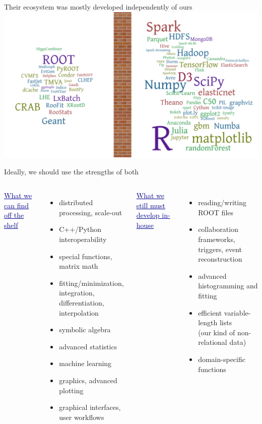 \documentclass[aspectratio=169]{beamer}
\begin{document}
\begin{frame}{Their ecosystem was mostly developed independently of ours}
\vspace{0.17 cm}
\includegraphics[width=\linewidth]{separation-2.png}
\end{frame}

\begin{frame}{Ideally, we should use the strengths of both}
\vspace{0.5 cm}
\large
\begin{columns}[t]
\textcolor{darkblue}{\underline{What we can find off the shelf}}

\vspace{0.1 cm}
\begin{itemize}\setlength{\itemsep}{0.1 cm}
\item distributed processing, scale-out
\item C++/Python interoperability
\item special functions, matrix math
\item fitting/minimization, integration, differentiation, interpolation
\item symbolic algebra
\item advanced statistics
\item machine learning
\item graphics, advanced plotting
\item graphical interfaces, user workflows
\end{itemize}

\textcolor{darkblue}{\underline{What we still must develop in-house}}

\vspace{0.1 cm}
\begin{itemize}\setlength{\itemsep}{0.1 cm}
\item reading/writing ROOT files
\item collaboration frameworks, triggers, event reconstruction
\item advanced histogramming and fitting
\item efficient variable-length lists \\ (our kind of non-relational data)
\item domain-specific functions
\end{itemize}
\end{columns}
\end{frame}
\end{document}
